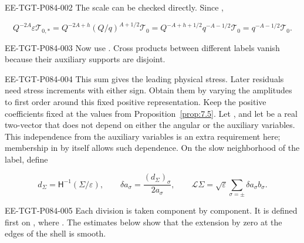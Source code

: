 \begin{EESegment}{EE-TGT-P084-002}
The scale can be checked directly. Since ,
\end{EESegment}
\[
  Q^{-2A}\varepsilon\mathcal T_{0,*}
  =Q^{-2A+h}(Q/q)^{A+1/2}\mathcal T_0
  =Q^{-A+h+1/2}q^{-A-1/2}\mathcal T_0
  =q^{-A-1/2}\mathcal T_0.
\]
\begin{EESegment}{EE-TGT-P084-003}
Now use . Cross products between different labels vanish because their auxiliary supports are disjoint.
\end{EESegment}

\begin{EESegment}{EE-TGT-P084-004}
This sum gives the leading physical stress. Later residuals need stress increments with either sign. Obtain them by varying the amplitudes to first order around this fixed positive representation. Keep the positive coefficients  fixed at the values from Proposition~\ref{prop:7.5}. Let , and let  be a real two-vector that does not depend on either the angular or the auxiliary variables. This independence from the auxiliary variables is an extra requirement here; membership in  by itself allows such dependence. On the slow neighborhood of the label, define
\end{EESegment}
\begin{equation}
  d_\Sigma=\mathsf H^{-1}(\Sigma/\varepsilon),
  \qquad
  \delta a_\sigma=\frac{(d_\Sigma)_\sigma}{2a_\sigma},
  \qquad
  \mathcal L\Sigma=\sqrt{\varepsilon}\sum_{\sigma=\pm}\delta a_\sigma b_\sigma.
  \tag{7.31}\label{eq:7.31}
\end{equation}
\begin{EESegment}{EE-TGT-P084-005}
Each division is taken component by component. It is defined first on , where . The estimates below show that the extension by zero at the edges of the shell is smooth.
\end{EESegment}

